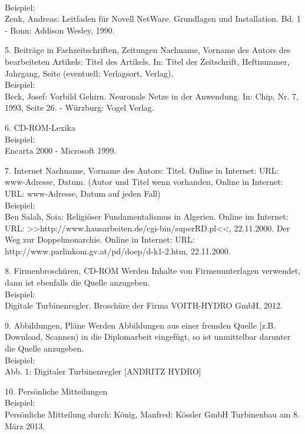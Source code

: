 \documentclass[12pt,a4paper]{article}
\begin{document}
{\begin{description*}
		\\[1mm]Beispiel:
		\\Zenk, Andreas: Leitfaden für Novell NetWare. Grundlagen und Installation. Bd. 1 - Bonn:
		Addison Wesley, 1990.
		\vspace*{2mm}
	\item[5. Beiträge in Fachzeitschriften, Zeitungen] Nachname, Vorname des Autors des bearbeiteten
		Artikels: Titel des Artikels. In: Titel der Zeitschrift, Heftnummer, Jahrgang, Seite
		(eventuell: Verlagsort, Verlag).
		\\[1mm]Beispiel:
		\\Beck, Josef: Vorbild Gehirn. Neuronale Netze in der Anwendung. In: Chip, Nr. 7, 1993,
		Seite 26. - Würzburg: Vogel Verlag.
		\vspace*{2mm}
	\item[6. CD-ROM-Lexika]\hfill
		\\[1mm]Beispiel:
		\\Encarta 2000 - Microsoft 1999.
		\vspace*{2mm}
	\item[7. Internet] Nachname, Vorname des Autors: Titel. Online in Internet: URL: www-Adresse, Datum.
		(Autor und Titel wenn vorhanden, Online in Internet: URL: www-Adresse, Datum auf
		jeden Fall)
		\\[1mm]Beispiel:
		\\Ben Salah, Soia: Religiöser Fundamentalismus in Algerien. Online im Internet:
		URL: >>http:/\slash{}www.hausarbeiten.de\slash{}cgi-bin\slash{}superRD.pl<<,
		22.11.2000. Der Weg zur Doppelmonarchie.
		Online in Internet: URL:
		http:/\slash{}www.parlinkom.gv.at\slash{}pd\slash{}doep\slash{}d-k1-2.htm,
		22.11.2000.
		\vspace*{2mm}
	\item[8. Firmenbroschüren, CD-ROM] Werden Inhalte von Firmenunterlagen verwendet,
		dann ist ebenfalls die Quelle anzugeben.
		\\[1mm]Beispiel:
		\\Digitale Turbinenregler. Broschüre der Firma VOITH-HYDRO GmbH, 2012.
		\vspace*{2mm}
	\item[9. Abbildungen, Pläne] Werden Abbildungen aus einer fremden Quelle
		[z.B. Download, Scannen) in die Diplomarbeit eingefügt,
		so ist unmittelbar darunter die Quelle anzugeben.
		\\[1mm]Beispiel:
		\\Abb. 1: Digitaler Turbinenregler [ANDRITZ HYDRO]
		\vspace*{2mm}
	\item[10. Persönliche Mitteilungen]\hfill
		\\[1mm]Beispiel:
		\\Persönliche Mitteilung durch: König, Manfred:
		Kössler GmbH Turbinenbau am 8. März 2013.
	\end{description*}
	}
%
%
\newpage
\end{document}
